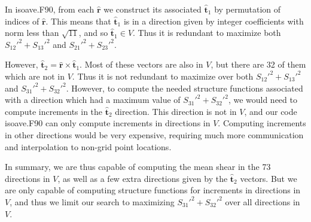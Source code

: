 \documentclass[12pt]{article}
\begin{document}
In isoave.F90, from each $\bm{{\hat r}}$ we construct its associated
$\bm{{\hat t}}_1$ by permutation of indices of $\bm{{\hat r}}$.
This means that $\bm{{\hat t}}_1$ is in a direction given by integer coefficients
with norm less than $\sqrt{11}$, and so $\bm{{\hat t}}_1 \in V$.  
Thus it is redundant to maximize
both $S_{12}'^2 + S_{13}'^2$ and $S_{21}'^2 + S_{23}'^2$.

However, $\bm{{\hat t}}_2 = \bm{{\hat r}} \times \bm{{\hat t}}_1$.
Most of these vectors are also in $V$, but there are 32 of them 
which are not in $V$.  Thus it is not redundant to maximize over
both $S_{12}'^2 + S_{13}'^2$ and $S_{31}'^2 + S_{32}'^2$.
However, to compute the needed structure functions associated with
a direction which had a maximum value of $S_{31}'^2 + S_{32}'^2$, we
would need to compute increments in the $\bm{{\hat t}}_2$ direction.
This direction is not in $V$, and our code isoave.F90 can only 
compute increments in directions in $V$.  Computing increments in
other directions would be very expensive, requiring much more communication
and interpolation to non-grid point locations.

In summary, we are thus capable of computing the mean shear in
the 73 directions in $V$, as well as a few extra directions given by the
$\bm{{\hat t}}_2$ vectors.   But we are only capable of computing
structure functions for increments in directions in $V$, and thus
we limit our search to maximizing $S_{31}'^2 + S_{32}'^2$ over
all directions in $V$.  
\end{document}
